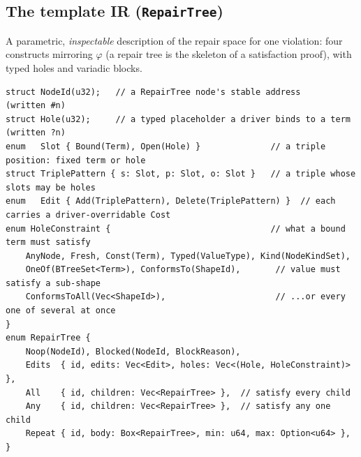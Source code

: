\documentclass[11pt]{article}
\newcommand{\code}[1]{\texttt{#1}}
\theoremstyle{definition}
\begin{document}
\subsection{The template IR (\code{RepairTree})}
A parametric, \emph{inspectable} description of the repair space for one
violation: four constructs mirroring $\varphi$ (a repair tree is the skeleton of
a satisfaction proof), with typed holes and variadic blocks.
\begin{lstlisting}
struct NodeId(u32);   // a RepairTree node's stable address          (written #n)
struct Hole(u32);     // a typed placeholder a driver binds to a term (written ?n)
enum   Slot { Bound(Term), Open(Hole) }              // a triple position: fixed term or hole
struct TriplePattern { s: Slot, p: Slot, o: Slot }   // a triple whose slots may be holes
enum   Edit { Add(TriplePattern), Delete(TriplePattern) }  // each carries a driver-overridable Cost
enum HoleConstraint {                                // what a bound term must satisfy
    AnyNode, Fresh, Const(Term), Typed(ValueType), Kind(NodeKindSet),
    OneOf(BTreeSet<Term>), ConformsTo(ShapeId),       // value must satisfy a sub-shape
    ConformsToAll(Vec<ShapeId>),                      // ...or every one of several at once
}
enum RepairTree {
    Noop(NodeId), Blocked(NodeId, BlockReason),
    Edits  { id, edits: Vec<Edit>, holes: Vec<(Hole, HoleConstraint)> },
    All    { id, children: Vec<RepairTree> },  // satisfy every child
    Any    { id, children: Vec<RepairTree> },  // satisfy any one child
    Repeat { id, body: Box<RepairTree>, min: u64, max: Option<u64> },
}
\end{lstlisting}
\end{document}
